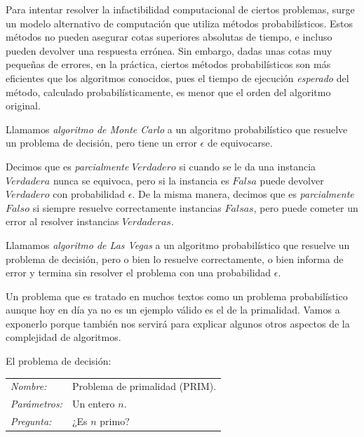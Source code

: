 Para intentar resolver la infactibilidad computacional de ciertos problemas, surge un modelo alternativo de computación que utiliza métodos probabilísticos. Estos métodos no pueden asegurar cotas superiores absolutas de tiempo, e incluso pueden devolver una respuesta errónea. Sin embargo, dadas unas cotas muy pequeñas de errores, en la práctica, ciertos métodos probabilísticos son más eficientes que los algoritmos conocidos, pues el tiempo de ejecución \textit{esperado} del método, calculado probabilísticamente, es menor que el orden del algoritmo original.



\begin{definition}
	Llamamos \textit{algoritmo de Monte Carlo} a un algoritmo probabilístico que resuelve un problema de decisión, pero tiene un error $\epsilon$ de equivocarse.

	Decimos que es \textit{parcialmente} $Verdadero$ si cuando se le da una instancia $Verdadera$ nunca se equivoca, pero si la instancia es $Falsa$ puede devolver $Verdadero$ con probabilidad $\epsilon$. De la misma manera, decimos que es \textit{parcialmente} $Falso$ si siempre resuelve correctamente instancias $Falsas$, pero puede cometer un error al resolver instancias $Verdaderas$.
\end{definition}


\begin{definition}
	Llamamos \textit{algoritmo de Las Vegas} a un algoritmo probabilístico que resuelve un problema de decisión, pero o bien lo resuelve correctamente, o bien informa de error y termina sin resolver el problema con una probabilidad $\epsilon$.
\end{definition}

Un problema que es tratado en muchos textos como un problema probabil\'istico aunque hoy en d\'ia ya no es un ejemplo v\'alido es el de la primalidad. Vamos a exponerlo porque tambi\'en nos servir\'a para explicar algunos otros aspectos de la complejidad de algoritmos.

\begin{example}
	El problema de decisión:

	\begin{tabular}{|ll}
		\textit{Nombre:} & Problema de primalidad (PRIM). \\
		\textit{Parámetros:} & Un entero $n$. \\
		\textit{Pregunta:} & ¿Es $n$ primo? \\
	\end{tabular}
	\\
	\hfil
\end{example}


